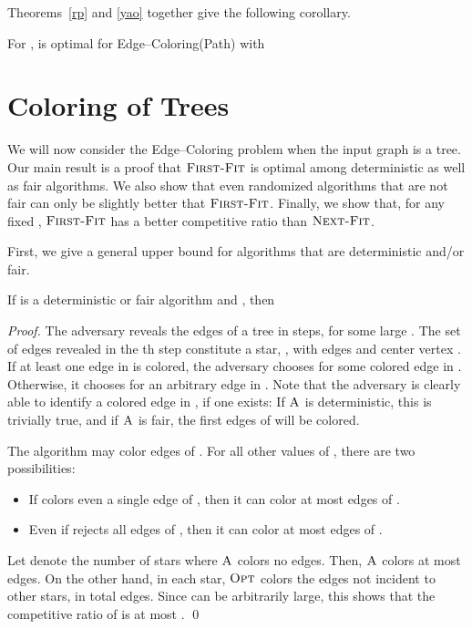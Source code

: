 \documentclass[smallextended]{svjour3}
\def\mck{{\sc Edge--Coloring}\xspace}
\def\mcpath{{\sc Edge--Coloring(Path)}\xspace}
\newcommand{\NF}{\ensuremath{\operatorname{\textsc{Next-Fit}}}\xspace}
\newcommand{\FF}{\ensuremath{\operatorname{\textsc{First-Fit}}}\xspace}
\newcommand{\OPT}{\ensuremath{\operatorname{\textsc{Opt}}}\xspace}
\newcommand{\ALG}{\ensuremath{\operatorname{\textsc{A}}}\xspace}
\begin{document}
Theorems~\ref{rp} and \ref{yao} together give the following corollary.

\begin{corollary}
For ,  is optimal for \mcpath with\vspace{-1mm}

\end{corollary}


\section{Coloring of Trees}
We will now consider the \mck problem when the input graph is a tree. 
Our main result is a proof that \FF is optimal among deterministic
 as well as fair algorithms. 
We also show that even randomized algorithms that are not fair can
only be slightly better that \FF.
Finally, we show that, for any fixed , \FF has a 
 better competitive ratio than \NF.

First, we give a general upper bound for algorithms that are deterministic and/or fair.

\begin{theorem}
\label{detupper}
If  is a deterministic or fair algorithm and , then 

\end{theorem}
\begin{proof}
The adversary reveals the edges of a tree in  steps, for some large . The set of edges revealed in the th step constitute a star, , with  edges and center vertex . If at least one edge in  is colored, the adversary chooses  for some colored edge  in . Otherwise, it chooses  for an arbitrary edge  in . Note that the adversary is clearly able to identify a colored edge in , if one exists: If \ALG is deterministic, this is trivially true, and if \ALG is fair,  the first  edges of  will be colored. 

The algorithm  may color  edges of . For all other values of , there are two possibilities:
\begin{itemize}
\item  If  colors even a
single edge of , then it can color at most  edges of
.
\item Even if  rejects all edges of , then it can color at most  edges of . 
\end{itemize}
Let  denote the number of stars where \ALG colors no edges.
Then, \ALG colors at most  edges.
On the other hand, in each star, \OPT colors the  edges not incident to other stars, in total  edges. Since  can be arbitrarily large, this shows that the competitive ratio of  is at most .
\qed\end{proof}
\end{document}
